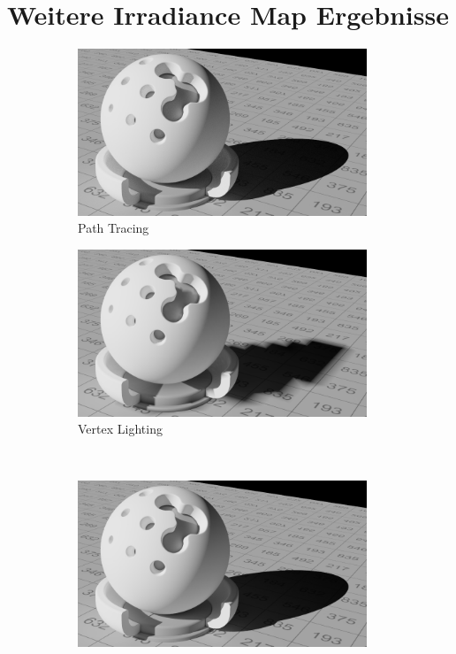 \section{Weitere Irradiance Map Ergebnisse} %
\label{sec:weitere_irradiance_map_ergebnisse}

	\begin{figure}[H]
		\begin{subfigure}[b]{0.5\textwidth}
			\center
			\includegraphics[width=0.95\textwidth]{pic/irrmap-shaderball-ref.png}
			\caption{Path Tracing}
			\label{subfig:irrmap-shaderball-ref}
		\end{subfigure}
		\begin{subfigure}[b]{0.5\textwidth}
			\center
			\includegraphics[width=0.95\textwidth]{pic/irrmap-shaderball-vmap.png}
			\caption{Vertex Lighting}
			\label{subfig:irrmap-shaderball-vmap}
		\end{subfigure}
		\medskip \\
		\begin{subfigure}[b]{0.5\textwidth}
			\center
			\includegraphics[width=0.95\textwidth]{pic/irrmap-shaderball-irrmap.png}

\end{subfigure}
\end{figure}
